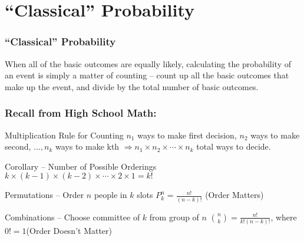 \section{``Classical'' Probability}

\begin{frame}

\frametitle{``Classical'' Probability}

When all of the basic outcomes are equally likely, calculating the probability of an event is simply a matter of counting -- count up all the basic outcomes that make up the event, and divide by the total number of basic outcomes.

\end{frame}
\begin{frame}
\frametitle{Recall from High School Math:}

\begin{block}{Multiplication Rule for Counting}
$n_1$ ways to make first decision, $n_2$ ways to make second, $\hdots, n_k$ ways to make kth $\Rightarrow n_1 \times n_2 \times \cdots \times n_k$ total ways to decide. \end{block}
\begin{block}{Corollary -- Number of Possible Orderings}
$k \times(k-1)\times (k-2) \times \cdots\times  2 \times 1 = k!$
\end{block}

\begin{block}{Permutations -- Order $n$ people in $k$ slots}
$P_k^n = \frac{n!}{(n-k)!}$ \hfill \alert{(Order Matters)}\end{block}

\begin{block}{Combinations -- Choose committee of $k$ from group of $n$}
${n \choose k} = \frac{n!}{k! (n-k)!}$, where $0! = 1$\hfill \alert{(Order Doesn't Matter)}\end{block}

\end{frame}

